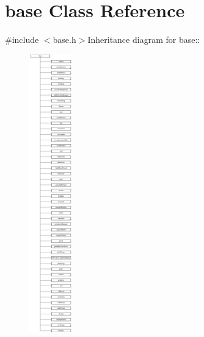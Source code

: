 \hypertarget{classbase}{
\section{base Class Reference}
\label{classbase}
}


{\ttfamily \#include $<$base.h$>$}Inheritance diagram for base::\begin{figure}[H]
\begin{center}
\leavevmode
\includegraphics[height=12cm]{classbase}
\end{center}
\end{figure}

